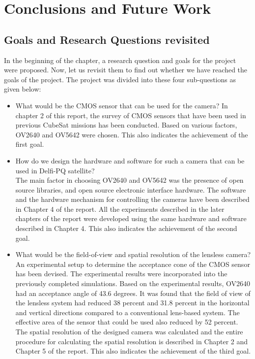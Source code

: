 \chapter{Conclusions and Future Work}
\label{chp:conclusionsandfuturework}

\section{Goals and Research Questions revisited}
In the beginning of the chapter, a research question and goals for the project were proposed. Now, let us revisit them to find out whether we have reached the goals of the project. The project was divided into these four sub-questions as given below:
\begin{itemize}
\item What would be the CMOS sensor that can be used for the camera? 
In chapter 2 of this report, the survey of CMOS sensors that have been used in previous CubeSat missions has been conducted. Based on various factors, OV2640 and OV5642 were chosen. This also indicates the achievement of the first goal.
\item How do we design the hardware and software for such a camera that can be used in Delfi-PQ satellite?\\
The main factor in choosing OV2640 and OV5642 was the presence of open source libraries,  and open source electronic interface hardware. The software and the hardware mechanism for controlling the cameras have been described in Chapter 4 of the report. All the experiments described in the later chapters of the report were developed using the same hardware and software described in Chapter 4. This also indicates the achievement of the second goal.
\item What would be the field-of-view and spatial resolution of the lensless camera?\\
An experimental setup to determine the acceptance cone of the CMOS sensor has been devised. The experimental results were incorporated into the previously completed simulations. Based on the experimental results, OV2640 had an acceptance angle of 43.6 degrees. It was found that the field of view of the lensless system had reduced 38 percent and 31.8 percent in the horizontal and vertical directions compared to a conventional lens-based system. The effective area of the sensor that could be used also reduced by 52 percent. The spatial resolution of the designed camera was calculated and the entire procedure for calculating the spatial resolution is described in Chapter 2 and Chapter 5 of the report. This also indicates the achievement of the third goal.

\end{itemize}
